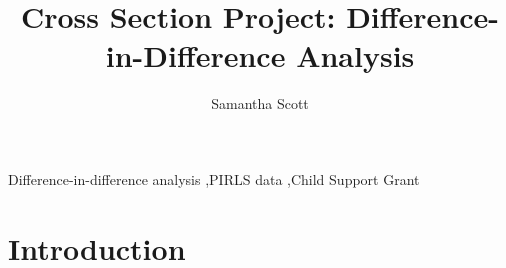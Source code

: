 \documentclass[11pt,preprint, authoryear]{elsarticle}
\numberwithin{equation}{section}
\numberwithin{figure}{section}
\numberwithin{table}{section}
\begin{document}
\begin{frontmatter}  %

\title{Cross Section Project: Difference-in-Difference Analysis}





\author[Add1]{Samantha Scott}





\address[Add1]{Stellenbosch University, Cape Town, South Africa}



\vspace{1cm}


\begin{keyword}
\footnotesize{
Difference-in-difference analysis \sep PIRLS data \sep Child Support
Grant \\
\vspace{0.3cm}
}
\end{keyword}



\vspace{0.5cm}

\end{frontmatter}



\pagestyle{fancy}
\chead{}
\rhead{}
\lfoot{}
\lhead{}
\cfoot{}


\headsep 35pt %




\newpage

\hypertarget{introduction}{%
\section{Introduction}\label{introduction}}
\end{document}
